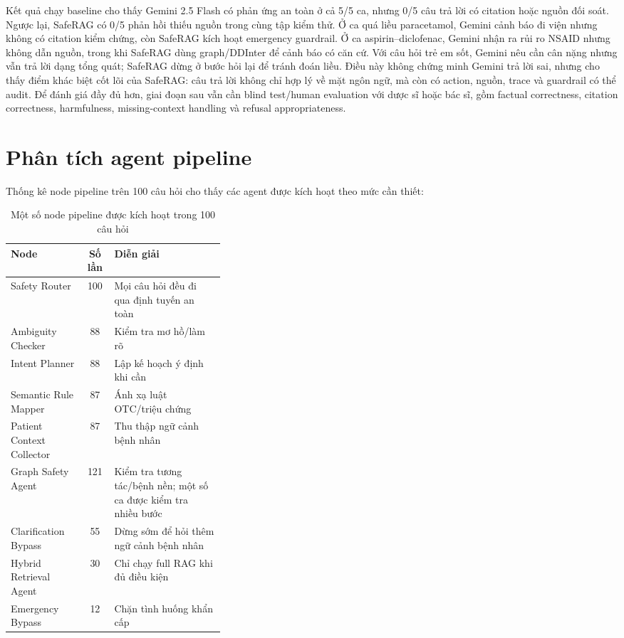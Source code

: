 Kết quả chạy baseline cho thấy Gemini 2.5 Flash có phản ứng an toàn ở cả 5/5 ca, nhưng 0/5 câu trả lời có citation hoặc nguồn đối soát. Ngược lại, SafeRAG có 0/5 phản hồi thiếu nguồn trong cùng tập kiểm thử. Ở ca quá liều paracetamol, Gemini cảnh báo đi viện nhưng không có citation kiểm chứng, còn SafeRAG kích hoạt emergency guardrail. Ở ca aspirin--diclofenac, Gemini nhận ra rủi ro NSAID nhưng không dẫn nguồn, trong khi SafeRAG dùng graph/DDInter để cảnh báo có căn cứ. Với câu hỏi trẻ em sốt, Gemini nêu cần cân nặng nhưng vẫn trả lời dạng tổng quát; SafeRAG dừng ở bước hỏi lại để tránh đoán liều. Điều này không chứng minh Gemini trả lời sai, nhưng cho thấy điểm khác biệt cốt lõi của SafeRAG: câu trả lời không chỉ hợp lý về mặt ngôn ngữ, mà còn có action, nguồn, trace và guardrail có thể audit. Để đánh giá đầy đủ hơn, giai đoạn sau vẫn cần blind test/human evaluation với dược sĩ hoặc bác sĩ, gồm factual correctness, citation correctness, harmfulness, missing-context handling và refusal appropriateness.

\section{Phân tích agent pipeline}

Thống kê node pipeline trên 100 câu hỏi cho thấy các agent được kích hoạt theo mức cần thiết:

\begin{table}[H]
\centering
\small
\caption{Một số node pipeline được kích hoạt trong 100 câu hỏi}
\begin{tabularx}{\linewidth}{p{0.35\linewidth} C Y}
\toprule
\textbf{Node} & \textbf{Số lần} & \textbf{Diễn giải} \\
\midrule
Safety Router & 100 & Mọi câu hỏi đều đi qua định tuyến an toàn \\
Ambiguity Checker & 88 & Kiểm tra mơ hồ/làm rõ \\
Intent Planner & 88 & Lập kế hoạch ý định khi cần \\
Semantic Rule Mapper & 87 & Ánh xạ luật OTC/triệu chứng \\
Patient Context Collector & 87 & Thu thập ngữ cảnh bệnh nhân \\
Graph Safety Agent & 121 & Kiểm tra tương tác/bệnh nền; một số ca được kiểm tra nhiều bước \\
Clarification Bypass & 55 & Dừng sớm để hỏi thêm ngữ cảnh bệnh nhân \\
Hybrid Retrieval Agent & 30 & Chỉ chạy full RAG khi đủ điều kiện \\
Emergency Bypass & 12 & Chặn tình huống khẩn cấp \\
\bottomrule
\end{tabularx}
\end{table}

